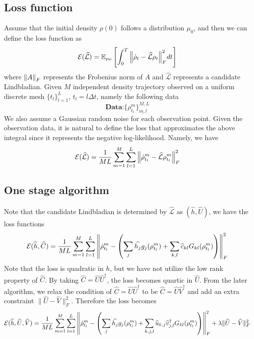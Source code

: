 \documentclass[10pt]{article}  %
\theoremstyle{plain}
\numberwithin{equation}{section}
\newcommand{\rbracket}[1]{\left(#1\right)}      %
\def\mL{\mathcal{L}}
\def\mE{\mathcal{E}}
\begin{document}
\subsection{Loss function}
Assume that the initial density $\rho(0)$ follows a distribution $\mu_0$, and then we can define the loss function as
\begin{equation}
	\mE(\widehat{\mL}) = \mathbb{E}_{\mu_0}\left[\int_0^T \norm{\dot{\rho}_t - \widehat{\mL}\rho_t }_F^2 dt\right]
\end{equation}
where $\norm{A}_F$ represents the Frobenius norm of $A$ and $\widehat{\mL}$ represents a candidate Lindbladian. 
Given $M$ independent density trajectory observed on a uniform discrete mesh $\{t_l\}_{l = 1}^L$, $t_l = l \Delta t$, namely the following data
\begin{equation}
	\textbf{Data:} \{\rho^m_{t_l}\}_{m, l}^{M, L}
\end{equation}
We also assume a Gaussian random noise for each observation point.  Given the observation data, it is natural to define the loss that approximates the above integral since it represents the negative log-likelihood. Namely, we have 
\begin{equation}
	\mE(\widehat{\mL}) = \frac{1}{ML}\sum_{m = 1}^M\sum_{l = 1}^L \norm{\dot{\rho}^{m}_{t_l} - \widehat{\mL}\rho^m_{t_l} }_F^2
\end{equation}

\subsection{One stage algorithm}
Note that the candidate Lindbladian is determined by $\widehat{\mL}$ as $(\widehat{h}, \widehat{U})$, we have the loss functions
\begin{equation}
	\mE(\widehat{h}, \widehat{C}) = \frac{1}{ML}\sum_{m = 1}^M\sum_{l = 1}^L \norm{\dot{\rho}^{m}_{t_l} - \rbracket{\sum_{j}\widehat{h_j}g_j(\rho^m_{t_l}) + \sum_{k, l}\widehat c_{kl}G_{kl}(\rho^m_{t_l})}}_F^2
\end{equation}
Note that the loss is quadratic in $h$, but we have not utilize the low rank property of $\widehat{C}$. By taking $\widehat{C} = \widehat{U}\widehat{U}^\dagger$, the loss becomes quartic in $\widehat{U}$. From the later algorithm, we relax the condition of $\widehat{C} = \widehat{U}\widehat{U}^\dagger$ to be $\widehat{C} = \widehat{U}\widehat{V}^\dagger$ and add an extra constraint $\|\widehat{U} - \widehat{V}\|_F^2$. Therefore the loss becomes 
\begin{equation}
	\mE(\widehat{h}, \widehat{U}, \widehat{V}) = \frac{1}{ML}\sum_{m = 1}^M\sum_{l = 1}^L \norm{\dot{\rho}^{m}_{t_l} - \rbracket{\sum_{j}\widehat{h_j}g_j(\rho^m_{t_l}) + \sum_{k, j, l}\widehat u_{k, j}\widehat v^\dagger_{j, l}G_{kl}(\rho^m_{t_l})}}_F^2	+ \lambda\|\widehat{U} - \widehat{V}\|_F^2
\end{equation}
\end{document}
